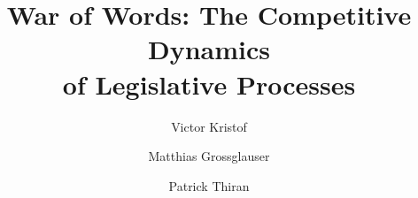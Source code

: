\documentclass[sigconf]{acmart}
\begin{document}
\title[The Competitive Dynamics of Legislative Processes]{War of Words: The Competitive Dynamics \texorpdfstring{\\of Legislative Processes}{}}

\author{Victor Kristof}

\author{Matthias Grossglauser}

\author{Patrick Thiran}


\begin{abstract}
	
\end{abstract}


\end{document}
